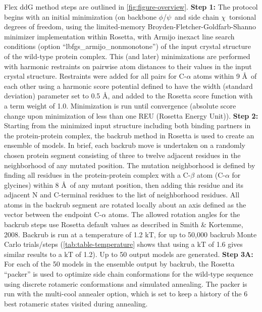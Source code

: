 Flex ddG method steps are outlined in \cref{fig:figure-overview}.
\textbf{Step 1:} The protocol begins with an initial minimization (on backbone $\phi$/$\psi$\ and side chain $\chi$\ torsional degrees of freedom, using the limited-memory Broyden-Fletcher-Goldfarb-Shanno minimizer implementation within Rosetta, with Armijo inexact line search conditions (option ``lbfgs\_armijo\_nonmonotone'') of the input crystal structure of the wild-type protein complex.
This (and later) minimizations are performed with harmonic restraints on pairwise atom distances to their values in the input crystal structure.
Restraints were added for all pairs for C-$\alpha$ atoms within 9 \AA\ of each other using a harmonic score potential defined to have the width (standard deviation) parameter set to 0.5 \AA, and added to the Rosetta score function with a term weight of 1.0.
Minimization is run until convergence (absolute score change upon minimization of less than one REU (Rosetta Energy Unit)).
\textbf{Step 2:} Starting from the minimized input structure including both binding partners in the protein-protein complex, the backrub method in Rosetta\cite{smith_backrub-like_2008} is used to create an ensemble of models.
In brief, each backrub move is undertaken on a randomly chosen protein segment consisting of three to twelve adjacent residues in the neighborhood of any mutated position.
The mutation neighborhood is defined by finding all residues in the protein-protein complex with a C-$\beta$ atom (C-$\alpha$ for glycines) within 8 \AA\ of any mutant position, then adding this residue and its adjacent N and C-terminal residues to the list of neighborhood residues.
All atoms in the backrub segment are rotated locally about an axis defined as the vector between the endpoint C-$\alpha$ atoms.
The allowed rotation angles for the backrub steps use Rosetta default values as described in Smith \& Kortemme, 2008\cite{smith_backrub-like_2008}.
Backrub is run at a temperature of 1.2 kT, for up to 50,000 backrub Monte Carlo trials/steps (\cref{tab:table-temperature} shows that using a kT of 1.6 gives similar results to a kT of 1.2).
Up to 50 output models are generated.
\textbf{Step 3A:} For each of the 50 models in the ensemble output by backrub, the Rosetta ``packer'' is used to optimize side chain conformations for the wild-type sequence using discrete rotameric conformations \cite{shapovalov_smoothed_2011} and simulated annealing. The packer is run with the multi-cool annealer option\cite{leaver-fay_generic_2011}, which is set to keep a history of the 6 best rotameric states visited during annealing.
